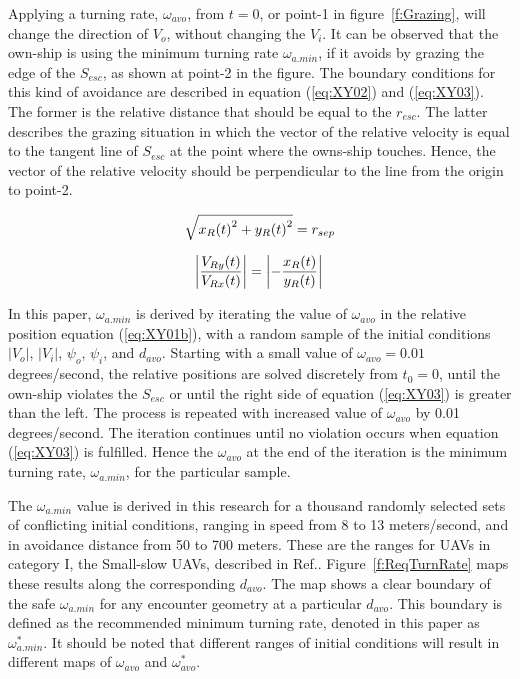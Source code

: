 Applying a turning rate, $\omega_{avo}$, from $t=0$, or point-1 in figure~\ref{f:Grazing}, will change the direction of $V_o$, without changing the $V_i$. It can be observed that the own-ship is using the minimum turning rate $\omega_{a.min}$, if it avoids by grazing the edge of the $S_{esc}$, as shown at point-2 in the figure. The boundary conditions for this kind of avoidance are described in equation (\ref{eq:XY02}) and (\ref{eq:XY03}). The former is the relative distance that should be equal to the $r_{esc}$. The latter describes the grazing situation in which the vector of the relative velocity is equal to the tangent line of $S_{esc}$ at the point where the owns-ship touches. Hence, the vector of the relative velocity should be perpendicular to the line from the origin to point-2. 

\begin{equation}
	\label{eq:XY02}
	\sqrt{ {x_R(t)} ^2  +  {y_R(t)} ^2}  = r_{sep} \\ 
\end{equation}

\begin{equation}
\label{eq:XY03}
\left| \frac{V_{Ry}(t)}{V_{Rx}(t)} \right|  = \left|  -\frac{x_R(t)}{y_R(t)} \right|  \\ 
\end{equation}

In this paper, $\omega_{a.min}$ is derived by iterating the value of $\omega_{avo}$ in the relative position equation (\ref{eq:XY01b}), with a random sample of the initial conditions $|V_o|$, $|V_i|$, $\psi_o$, $\psi_i$, and $d_{avo}$. Starting with a small value of $\omega_{avo} =0.01$ degrees/second, the relative positions are solved discretely from $t_0 = 0$, until the own-ship violates the $S_{esc}$ or until the right side of equation (\ref{eq:XY03}) is greater than the left. The process is repeated with increased value of $\omega_{avo}$ by 0.01 degrees/second. The iteration continues until no violation occurs when equation (\ref{eq:XY03}) is fulfilled. Hence the $\omega_{avo}$ at the end of the iteration is the minimum turning rate, $\omega_{a.min}$, for the particular sample.

The $\omega_{a.min}$ value is derived in this research for a thousand randomly selected sets of conflicting initial conditions, ranging in speed from 8 to 13 meters/second, and in avoidance distance from 50 to 700 meters. These are the ranges for UAVs in category I, the Small-slow UAVs, described in Ref.\cite{Jenie:13a}. Figure~\ref{f:ReqTurnRate} maps these results along the corresponding $d_{avo}$. The map shows a clear boundary of the safe $\omega_{a.min}$ for any encounter geometry at a particular $d_{avo}$. This boundary is defined as the recommended minimum turning rate, denoted in this paper as $\omega_{a.min}^*$. It should be noted that different ranges of initial conditions will result in different maps of $\omega_{avo}$ and $\omega_{avo}^*$. 


